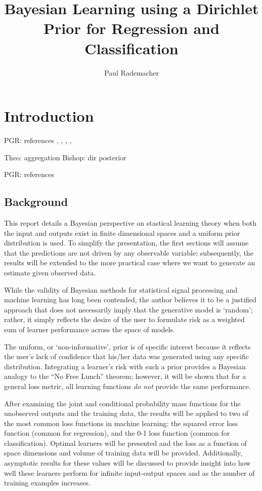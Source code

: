 \documentclass[12pt]{report}
\title{Bayesian Learning using a Dirichlet Prior for Regression and Classification}
\author{Paul Rademacher}
\begin{document}
\maketitle
\tableofcontents

\chapter{Introduction}


PGR: references 
\cite{papoulis}, \cite{bishop}, \cite{theodoridis-ML}, \cite{kay-est}, \cite{kay-det}

Theo: aggregation
Bishop: dir posterior

PGR: references


\section{Background}

This report details a Bayesian perspective on stastical learning theory when both the input and outputs exist in finite dimensional spaces and a uniform prior distribution is used. To simplify the presentation, the first sections will assume that the predictions are not driven by any observable variable; subsequently, the results will be extended to the more practical case where we want to generate an estimate given observed data.

While the validity of Bayesian methods for statistical signal processing and machine learning has long been contended, the author believes it to be a justified approach that does not necessarily imply that the generative model is `random'; rather, it simply reflects the desire of the user to formulate risk as a weighted sum of learner performance across the space of models. 

The uniform, or `non-informative', prior is of specific interest because it reflects the user's lack of confidence that his/her data was generated using any specific distribution. Integrating a learner's risk with such a prior provides a Bayesian analogy to the ``No Free Lunch'' theorem; however, it will be shown that for a general loss metric, all learning functions \emph{do not} provide the same performance.

After examining the joint and conditional probability mass functions for the unobserved outputs and the training data, the results will be applied to two of the most common loss functions in machine learning: the squared error loss function (common for regression), and the 0-1 loss function (common for classification). Optimal learners will be presented and the loss as a function of space dimensions and volume of training data will be provided. Additionally, asymptotic results for these values will be discussed to provide insight into how well these learners perform for infinite input-output spaces and as the number of training examples increases. 
\end{document}

